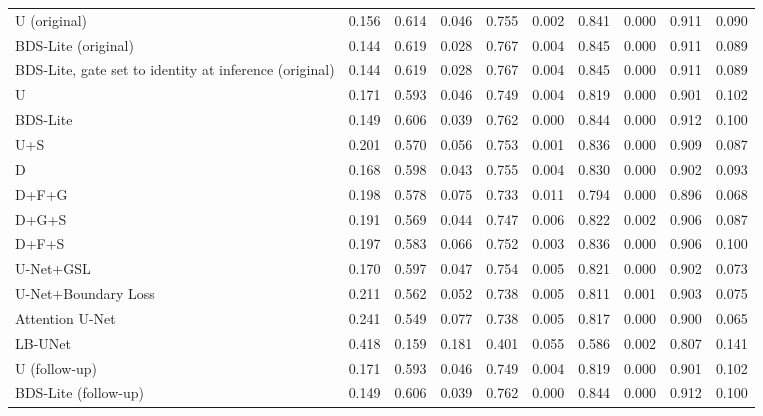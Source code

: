 \begin{tabular}{@{}lrrrrrrrrr@{}}
\midrule
U (original) & 0.156 & 0.614 & 0.046 & 0.755 & 0.002 & 0.841 & 0.000 & 0.911 & 0.090 \\
BDS-Lite (original) & 0.144 & 0.619 & 0.028 & 0.767 & 0.004 & 0.845 & 0.000 & 0.911 & 0.089 \\
BDS-Lite, gate set to identity at inference (original) & 0.144 & 0.619 & 0.028 & 0.767 & 0.004 & 0.845 & 0.000 & 0.911 & 0.089 \\
U & 0.171 & 0.593 & 0.046 & 0.749 & 0.004 & 0.819 & 0.000 & 0.901 & 0.102 \\
BDS-Lite & 0.149 & 0.606 & 0.039 & 0.762 & 0.000 & 0.844 & 0.000 & 0.912 & 0.100 \\
U+S & 0.201 & 0.570 & 0.056 & 0.753 & 0.001 & 0.836 & 0.000 & 0.909 & 0.087 \\
D & 0.168 & 0.598 & 0.043 & 0.755 & 0.004 & 0.830 & 0.000 & 0.902 & 0.093 \\
D+F+G & 0.198 & 0.578 & 0.075 & 0.733 & 0.011 & 0.794 & 0.000 & 0.896 & 0.068 \\
D+G+S & 0.191 & 0.569 & 0.044 & 0.747 & 0.006 & 0.822 & 0.002 & 0.906 & 0.087 \\
D+F+S & 0.197 & 0.583 & 0.066 & 0.752 & 0.003 & 0.836 & 0.000 & 0.906 & 0.100 \\
U-Net+GSL & 0.170 & 0.597 & 0.047 & 0.754 & 0.005 & 0.821 & 0.000 & 0.902 & 0.073 \\
U-Net+Boundary Loss & 0.211 & 0.562 & 0.052 & 0.738 & 0.005 & 0.811 & 0.001 & 0.903 & 0.075 \\
Attention U-Net & 0.241 & 0.549 & 0.077 & 0.738 & 0.005 & 0.817 & 0.000 & 0.900 & 0.065 \\
LB-UNet & 0.418 & 0.159 & 0.181 & 0.401 & 0.055 & 0.586 & 0.002 & 0.807 & 0.141 \\
U (follow-up) & 0.171 & 0.593 & 0.046 & 0.749 & 0.004 & 0.819 & 0.000 & 0.901 & 0.102 \\
BDS-Lite (follow-up) & 0.149 & 0.606 & 0.039 & 0.762 & 0.000 & 0.844 & 0.000 & 0.912 & 0.100 \\
\bottomrule
\end{tabular}
